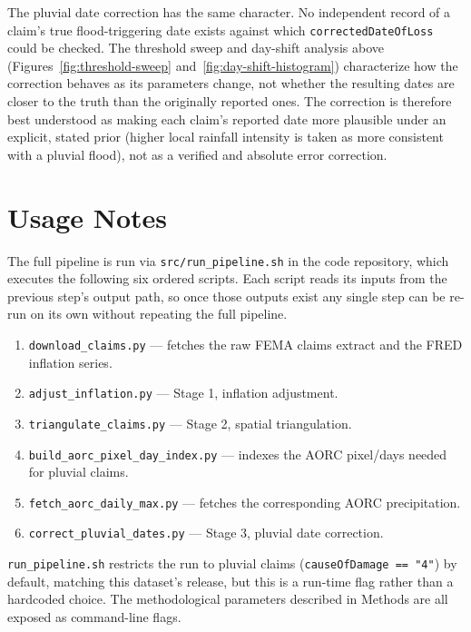 The pluvial date correction has the same character. No independent
record of a claim's true flood-triggering date exists against which
\texttt{correctedDateOfLoss} could be checked. The threshold sweep and
day-shift analysis above (Figures~\ref{fig:threshold-sweep}
and~\ref{fig:day-shift-histogram}) characterize how the correction
behaves as its parameters change, not whether the resulting dates are
closer to the truth than the originally reported ones. The correction
is therefore best understood as making each claim's reported date more
plausible under an explicit, stated prior (higher local rainfall
intensity is taken as more consistent with a pluvial flood), not as a
verified and absolute error correction.


\section*{Usage Notes}

The full pipeline is run via \texttt{src/run\_pipeline.sh} in the code
repository, which executes the following six ordered scripts. Each
script reads its inputs from the previous step's output path, so once
those outputs exist any single step can be re-run on its own without
repeating the full pipeline.

\begin{enumerate}
  \item \texttt{download\_claims.py} --- fetches the raw FEMA claims
    extract and the FRED inflation series.
  \item \texttt{adjust\_inflation.py} --- Stage 1, inflation adjustment.
  \item \texttt{triangulate\_claims.py} --- Stage 2, spatial
    triangulation.
  \item \texttt{build\_aorc\_pixel\_day\_index.py} --- indexes the AORC
    pixel/days needed for pluvial claims.
  \item \texttt{fetch\_aorc\_daily\_max.py} --- fetches the corresponding
    AORC precipitation.
  \item \texttt{correct\_pluvial\_dates.py} --- Stage 3, pluvial date
    correction.
\end{enumerate}

\texttt{run\_pipeline.sh} restricts the run to pluvial claims
(\texttt{causeOfDamage == "4"}) by default, matching this dataset's
release, but this is a run-time flag rather than a hardcoded choice.
The methodological parameters described in Methods are all exposed as
command-line flags.

